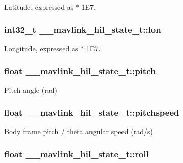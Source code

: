 Latitude, expressed as $\ast$ 1\+E7. 

\hypertarget{struct____mavlink__hil__state__t_aeac8427298a17d090889edf71a21c6ac}{
\subsubsection[{lon}]{\setlength{\rightskip}{0pt plus 5cm}int32\+\_\+t \+\_\+\+\_\+mavlink\+\_\+hil\+\_\+state\+\_\+t\+::lon}}\label{struct____mavlink__hil__state__t_aeac8427298a17d090889edf71a21c6ac}


Longitude, expressed as $\ast$ 1\+E7. 

\hypertarget{struct____mavlink__hil__state__t_a734b8ba645687e5673c599c4a9a950f1}{
\subsubsection[{pitch}]{\setlength{\rightskip}{0pt plus 5cm}float \+\_\+\+\_\+mavlink\+\_\+hil\+\_\+state\+\_\+t\+::pitch}}\label{struct____mavlink__hil__state__t_a734b8ba645687e5673c599c4a9a950f1}


Pitch angle (rad) 

\hypertarget{struct____mavlink__hil__state__t_ad7d8b42ee6698e6f892c20146f954d5a}{
\subsubsection[{pitchspeed}]{\setlength{\rightskip}{0pt plus 5cm}float \+\_\+\+\_\+mavlink\+\_\+hil\+\_\+state\+\_\+t\+::pitchspeed}}\label{struct____mavlink__hil__state__t_ad7d8b42ee6698e6f892c20146f954d5a}


Body frame pitch / theta angular speed (rad/s) 

\hypertarget{struct____mavlink__hil__state__t_a33202a922fda8d956b7ce78814d82558}{
\subsubsection[{roll}]{\setlength{\rightskip}{0pt plus 5cm}float \+\_\+\+\_\+mavlink\+\_\+hil\+\_\+state\+\_\+t\+::roll}}\label{struct____mavlink__hil__state__t_a33202a922fda8d956b7ce78814d82558}


